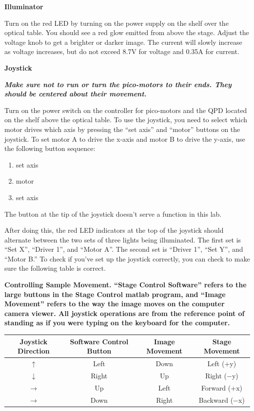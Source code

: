 \documentclass{../lab}
\begin{document}
\textbf{Illuminator}

Turn on the red LED by turning on the power supply on the shelf over the optical table. You should see a  red glow emitted from above the stage. Adjust the voltage knob to get a brighter or darker image. The current will slowly increase as voltage increases, but do not exceed 8.7V for voltage and 0.35A for current.

\textbf{Joystick}

\emph{\textbf{Make sure not to run or turn the pico-motors to their ends. They should be centered about their movement.}}

Turn on the power switch on the controller for pico-motors and the QPD located on the shelf above the optical table. To use the joystick, you need to select which motor drives which axis by pressing the ``set axis'' and ``motor'' buttons on the joystick. To set motor A to drive the x-axis and motor B to drive the y-axis, use the following button sequence:

\begin{enumerate}
    \item set axis

    \item motor

    \item set axis
\end{enumerate}

The button at the tip of the joystick doesn't serve a function in this lab.

After doing this, the red LED indicators at the top of the joystick should alternate between the two sets of three lights being illuminated. The first set is ``Set X'', ``Driver 1'', and ``Motor A''. The second set is ``Driver 1'', ``Set Y'', and ``Motor B.'' To check if you've set up the joystick correctly, you can check to make sure the following table is correct.

\textbf{Controlling Sample Movement. ``Stage Control Software'' refers to the large buttons in the Stage Control matlab program, and ``Image Movement'' refers to the way the image moves on the computer camera viewer.  All joystick operations are from the reference point of standing as if you were typing on the keyboard for the computer.}

\begin{center}
    \begin{tabular}{c|c|c|c}
        Joystick Direction & Software Control Button & Image Movement & Stage Movement \\\hline
        $\uparrow$    & Left  & Down  & Left (+y) \\\hline
        $\downarrow$  & Right & Up    & Right ($-$y) \\\hline
        $\rightarrow$ & Up    & Left  & Forward (+x) \\\hline
        $\rightarrow$ & Down  & Right & Backward ($-$x)
    \end{tabular}
\end{center}
\end{document}
